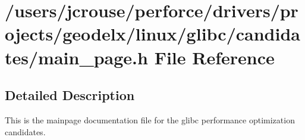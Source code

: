 \section{/users/jcrouse/perforce/drivers/projects/geodelx/linux/glibc/candidates/main\_\-page.h File Reference}
\label{main__page_8h}


\subsection{Detailed Description}
 This is the mainpage documentation file for the glibc performance optimization candidates.

